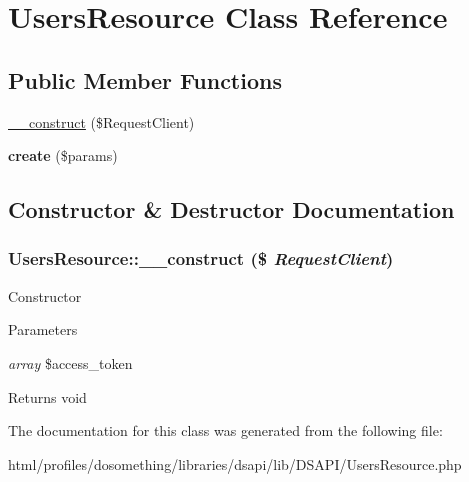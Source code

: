 \hypertarget{classUsersResource}{
\section{UsersResource Class Reference}
\label{classUsersResource}
}
\subsection*{Public Member Functions}
\begin{DoxyCompactItemize}
\item 
\hyperlink{classUsersResource_aa34f144b0742a0c8bea560d426825591}{\_\-\_\-construct} (\$RequestClient)
\item 
\hypertarget{classUsersResource_aaf2909f38b26e0c8e7b1273d0a7e1067}{
{\bfseries create} (\$params)}
\label{classUsersResource_aaf2909f38b26e0c8e7b1273d0a7e1067}

\end{DoxyCompactItemize}


\subsection{Constructor \& Destructor Documentation}
\hypertarget{classUsersResource_aa34f144b0742a0c8bea560d426825591}{
\subsubsection[{\_\-\_\-construct}]{\setlength{\rightskip}{0pt plus 5cm}UsersResource::\_\-\_\-construct (\$ {\em RequestClient})}}
\label{classUsersResource_aa34f144b0742a0c8bea560d426825591}
Constructor


\begin{DoxyParams}{Parameters}
\item[{\em array}]\$access\_\-token \end{DoxyParams}
\begin{DoxyReturn}{Returns}
void 
\end{DoxyReturn}


The documentation for this class was generated from the following file:\begin{DoxyCompactItemize}
\item 
html/profiles/dosomething/libraries/dsapi/lib/DSAPI/UsersResource.php\end{DoxyCompactItemize}

